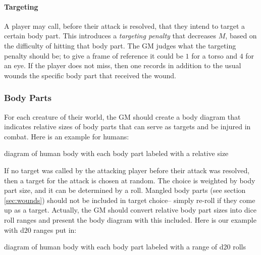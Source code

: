 \documentclass[12pt]{article}
\newcommand{\notes}[1]{{\color{Tan} #1}}
\newcommand{\emdex}[1]{\emph{#1}\index{#1}}
\begin{document}
\paragraph{Targeting}
A player may call, before their attack is resolved, that they intend to target a certain body part.
This introduces a \emdex{targeting penalty} that decreases $M$, based on the difficulty of hitting that body part.
The GM judges what the targeting penalty should be;
to give a frame of reference it could be $1$ for a torso and $4$ for an eye.
If the player does not miss, then one records in addition to the usual wounds the specific body part that received the wound.


\subsubsection{Body Parts}\label{sec:bodyparts}

For each creature of their world, the GM should create a body diagram
that indicates relative sizes of body
parts that can serve as targets and be injured in combat.
Here is an example for humans:

\notes{diagram of human body with each body part labeled with a relative size}

\newcommand{\peup}{\notes{peup}}
If no target was called by the attacking player before their attack was resolved, then a target
for the attack is chosen at random. The choice is weighted by body part size,
and it can be determined by a roll.
Mangled body parts (see section \ref{sec:wounds}) should not be included in target choice--
simply re-roll if they come up as a target.
Actually, the GM should convert relative body part sizes into dice roll ranges
and present the body diagram with this included.
Here is our example with d$20$ ranges put in:

\notes{diagram of human body with each body part labeled with a range of d20 rolls}
\end{document}
